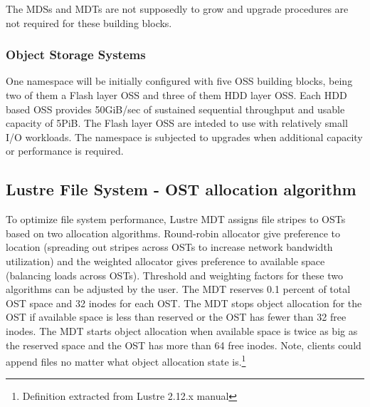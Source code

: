 \documentclass{article}
\begin{document}
The MDSs and MDTs are not supposedly to grow and upgrade procedures are not required for these building blocks.

\subsubsection{Object Storage Systems}
One namespace will be initially configured with five OSS building blocks, being two of them a Flash layer OSS and three of them HDD layer OSS. Each HDD based OSS provides 50GiB/sec of sustained sequential throughput and usable capacity of 5PiB. The Flash layer OSS are inteded to use with relatively small I/O workloads. The namespace is subjected to upgrades when additional capacity or performance is required. 


\subsection{Lustre File System - OST allocation algorithm}
To optimize file system performance, Lustre MDT assigns file stripes to OSTs based on two allocation algorithms. Round-robin allocator give preference to location (spreading out stripes across OSTs to increase network bandwidth utilization) and the weighted allocator gives preference to available space (balancing loads across OSTs). Threshold and weighting factors for these two algorithms can be adjusted by the user. The MDT reserves 0.1 percent of total OST space and 32 inodes for each OST. The MDT stops object allocation for the OST if available space is less than reserved or the OST has fewer than 32 free inodes. The MDT starts object allocation when available space is twice as big as the reserved space and the OST has more than 64 free inodes. Note, clients could append files no matter what object allocation state is.\footnote{Definition extracted from Lustre 2.12.x manual}
\end{document}

